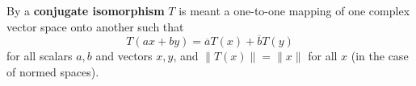 By a \textbf{conjugate isomorphism} $T$ is meant a one-to-one mapping of one complex vector space onto another such that
$$T(ax + by) = \overline{a} T(x) + \overline{b} T(y)$$
for all scalars $a, b$ and vectors $x, y$, and $\|T(x)\| = \|x\|$ for all $x$ (in the case of normed spaces).
